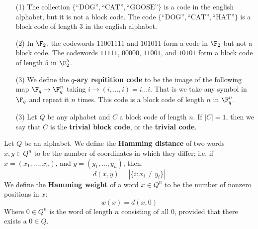 \begin{example}\label{example_1.2}
  \begin{enumerate}
    \item[(1)] The collection $\{\text{``DOG''}, \text{``CAT''},
      \text{``GOOSE''}\}$ is a code in the english alphabet, but it is not a
      block code. The code $\{\text{``DOG''}, \text{``CAT''},
      \text{``HAT''}\}$ is a block code of length $3$ in the english alphabet.

      \item[(2)] In $\F_2$, the codewords  $11001111$ and  $101011$ form a code
        in  $\F_2$ but not a block code. The codewords $11111$, $00000$,
        $11001$, and  $10101$ form a block code of length  $5$ in  $\F_2^5$.

      \item[(3)] We define the \textbf{$q$-ary repitition code} to be the image
        of the following map $\F_q \xrightarrow{} \F_q^n$ taking $i
        \xrightarrow{} (i, \dots, i)=i \dots i$. That is we take any symbol in
        $\F_q$ and repeat it $n$ times. This code is a block code of length $n$
        in $\F_q^n$.

      \item[(3)] Let $Q$ be any alphabet and  $C$ a block code of length  $n$.
        If $|C|=1$, then we say that $C$ is the  \textbf{trivial block code}, or
        the \textbf{trivial code}.
  \end{enumerate}
\end{example}

\begin{definition}
  Let $Q$ be an alphabet. We define the  \textbf{Hamming distance} of two words
  $x,y \in Q^n$ to be the number of coordinates in which they differ; i.e. if
  $x=(x_1, \dots, x_n)$, and $y=(y_1, \dots, y_n)$, then:
  \begin{equation}\label{equation_1.1}
    d(x,y)=|\{i : x_i \neq y_i\}|
  \end{equation}
  We define the \textbf{Hamming weight} of a word $x \in Q^n$ to be the number
  of nonzero positions in $x$:
  \begin{equation}\label{equation_1.3}
    w(x)=d(x,0)
  \end{equation}
  Where $0 \in Q^n$ is the word of length $n$ consisting of all $0$, provided
  that there exists a $0 \in Q$.
\end{definition}

